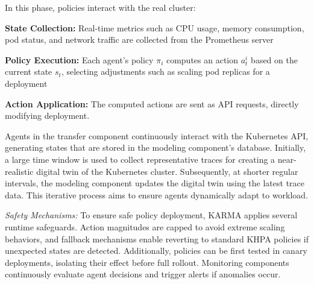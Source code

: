 In this phase, policies interact with the real cluster:
\begin{enumerate*}[label=\textbf{\arabic*)}, itemjoin={;\quad }]
  \item \textbf{State Collection:} Real-time metrics such as CPU usage, memory consumption, pod status, and network traffic are collected from the Prometheus server~\cite{prometheus}
  \item \textbf{Policy Execution:} Each agent's policy $\pi_i$ computes an action $a_t^i$ based on the current state $s_t$, selecting adjustments such as scaling pod replicas for a deployment
  \item \textbf{Action Application:} The computed actions are sent as API requests, directly modifying deployment.
\end{enumerate*}

Agents in the transfer component continuously interact with the Kubernetes API, generating states that are stored in the modeling component's database. Initially, a large time window is used to collect representative traces for creating a near-realistic digital twin of the Kubernetes cluster. Subsequently, at shorter regular intervals, the modeling component updates the digital twin using the latest trace data. This iterative process aims to ensure agents dynamically adapt to workload.

\noindent \textit{Safety Mechanisms:} To ensure safe policy deployment, KARMA applies several runtime safeguards. Action magnitudes are capped to avoid extreme scaling behaviors, and fallback mechanisms enable reverting to standard KHPA policies if unexpected states are detected. Additionally, policies can be first tested in canary deployments, isolating their effect before full rollout. Monitoring components continuously evaluate agent decisions and trigger alerts if anomalies occur.

%



